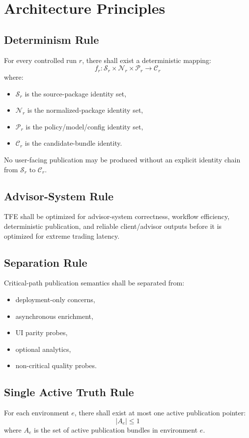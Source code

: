\chapter{Architecture Principles}
\section{Determinism Rule}

For every controlled run \(r\), there shall exist a deterministic mapping:
\[
f_r : \mathcal{S}_r \times \mathcal{N}_r \times \mathcal{P}_r \rightarrow \mathcal{C}_r
\]
where:
\begin{itemize}
    \item \(\mathcal{S}_r\) is the source-package identity set,
    \item \(\mathcal{N}_r\) is the normalized-package identity set,
    \item \(\mathcal{P}_r\) is the policy/model/config identity set,
    \item \(\mathcal{C}_r\) is the candidate-bundle identity.
\end{itemize}

No user-facing publication may be produced without an explicit identity chain from \(\mathcal{S}_r\) to \(\mathcal{C}_r\).

\section{Advisor-System Rule}
TFE shall be optimized for advisor-system correctness, workflow efficiency, deterministic publication, and reliable client/advisor outputs before it is optimized for extreme trading latency.

\section{Separation Rule}
Critical-path publication semantics shall be separated from:
\begin{itemize}
    \item deployment-only concerns,
    \item asynchronous enrichment,
    \item UI parity probes,
    \item optional analytics,
    \item non-critical quality probes.
\end{itemize}

\section{Single Active Truth Rule}
For each environment \(e\), there shall exist at most one active publication pointer:
\[
\left| A_e \right| \le 1
\]
where \(A_e\) is the set of active publication bundles in environment \(e\).

